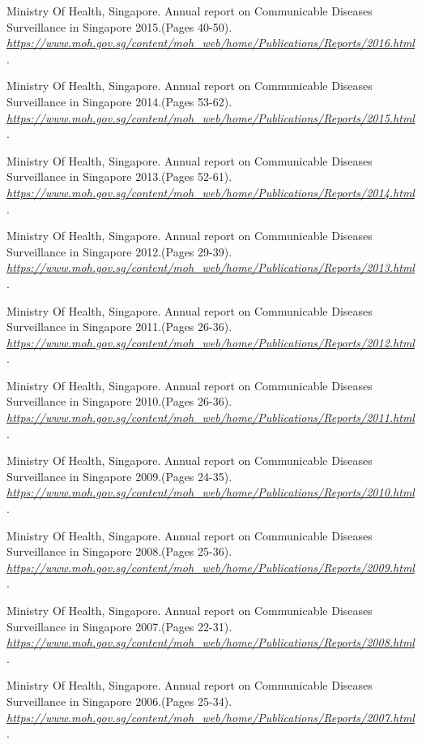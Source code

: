 \documentclass[11pt]{exam}
\begin{document}
\begin{thebibliography}{28}
Ministry Of Health, Singapore. Annual report on Communicable Diseases Surveillance in Singapore 2015.(Pages 40-50).
\textit{\url{https://www.moh.gov.sg/content/moh_web/home/Publications/Reports/2016.html}}.

Ministry Of Health, Singapore. Annual report on Communicable Diseases Surveillance in Singapore 2014.(Pages 53-62).
\textit{\url{https://www.moh.gov.sg/content/moh_web/home/Publications/Reports/2015.html}}.

Ministry Of Health, Singapore. Annual report on Communicable Diseases Surveillance in Singapore 2013.(Pages 52-61).
\textit{\url{https://www.moh.gov.sg/content/moh_web/home/Publications/Reports/2014.html}}.

Ministry Of Health, Singapore. Annual report on Communicable Diseases Surveillance in Singapore 2012.(Pages 29-39).
\textit{\url{https://www.moh.gov.sg/content/moh_web/home/Publications/Reports/2013.html}}.

Ministry Of Health, Singapore. Annual report on Communicable Diseases Surveillance in Singapore 2011.(Pages 26-36).
\textit{\url{https://www.moh.gov.sg/content/moh_web/home/Publications/Reports/2012.html}}.

Ministry Of Health, Singapore. Annual report on Communicable Diseases Surveillance in Singapore 2010.(Pages 26-36).
\textit{\url{https://www.moh.gov.sg/content/moh_web/home/Publications/Reports/2011.html}}.

Ministry Of Health, Singapore. Annual report on Communicable Diseases Surveillance in Singapore 2009.(Pages 24-35).
\textit{\url{https://www.moh.gov.sg/content/moh_web/home/Publications/Reports/2010.html}}.

Ministry Of Health, Singapore. Annual report on Communicable Diseases Surveillance in Singapore 2008.(Pages 25-36).
\textit{\url{https://www.moh.gov.sg/content/moh_web/home/Publications/Reports/2009.html}}.

Ministry Of Health, Singapore. Annual report on Communicable Diseases Surveillance in Singapore 2007.(Pages 22-31).
\textit{\url{https://www.moh.gov.sg/content/moh_web/home/Publications/Reports/2008.html}}.

Ministry Of Health, Singapore. Annual report on Communicable Diseases Surveillance in Singapore 2006.(Pages 25-34).
\textit{\url{https://www.moh.gov.sg/content/moh_web/home/Publications/Reports/2007.html}}.


\end{thebibliography}
\end{document}
